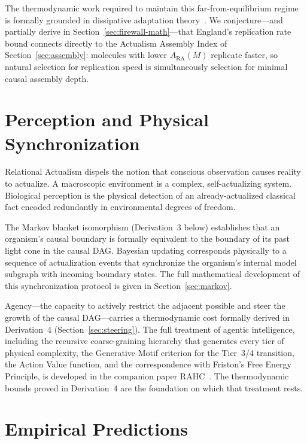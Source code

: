 \documentclass[11pt,a4paper]{article}
\theoremstyle{plain}
\theoremstyle{definition}
\theoremstyle{remark}
\newcommand{\ARA}{A_{\mathrm{RA}}}
\begin{document}
The thermodynamic work required to maintain this far-from-equilibrium regime is
formally grounded in dissipative adaptation theory~\citep{England2013}. We
conjecture---and partially derive in Section~\ref{sec:firewall-math}---that
England's replication rate bound connects directly to the Actualism Assembly Index
of Section~\ref{sec:assembly}: molecules with lower $\ARA(M)$ replicate faster, so
natural selection for replication speed is simultaneously selection for minimal
causal assembly depth.

\section{Perception and Physical Synchronization}
\label{sec:inference}

Relational Actualism dispels the notion that conscious observation causes reality
to actualize. A macroscopic environment is a complex, self-actualizing system.
Biological perception is the physical detection of an already-actualized classical
fact encoded redundantly in environmental degrees of freedom.

The Markov blanket isomorphism (Derivation~3 below) establishes that an organism's
causal boundary is formally equivalent to the boundary of its past light cone in
the causal DAG. Bayesian updating corresponds physically to a sequence of
actualization events that synchronize the organism's internal model subgraph with
incoming boundary states. The full mathematical development of this synchronization
protocol is given in Section~\ref{sec:markov}.

Agency---the capacity to actively restrict the adjacent possible and steer the
growth of the causal DAG---carries a thermodynamic cost formally derived in
Derivation~4 (Section~\ref{sec:steering}). The full treatment of agentic
intelligence, including the recursive coarse-graining hierarchy that generates
every tier of physical complexity, the Generative Motif criterion for the
Tier~3/4 transition, the Action Value function, and the correspondence with
Friston's Free Energy Principle, is developed in the companion paper
RAHC~\citep{Sandeman2026RAHC}. The thermodynamic bounds proved in Derivation~4
are the foundation on which that treatment rests.

\section{Empirical Predictions}
\label{sec:predictions}
\end{document}
